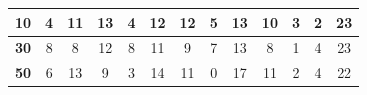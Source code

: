 \documentclass[12pt,a4paper]{report}
\begin{document}
{{{{{{\begin{table}[h]
\begin{tabular}{|c|c|c|c|c|c|c|c|c|c|c|c|c|}
{\bf 10} & 4             & 11            & 13            & 4             & 12             & 12             & 5              & 13              & 10            & 3         & 2         & 23        \\ \hline
{\bf 30} & 8             & 8            & 12            & 8             & 11             & 9             & 7              & 13              & 8             & 1         & 4         & 23        \\ \hline
{\bf 50} & 6             & 13            & 9            & 3             & 14             & 11             & 0              & 17              & 11             & 2         & 4         &  22        \\ \hline
\end{tabular}
\end{table}

}}}}}}
\end{document}

